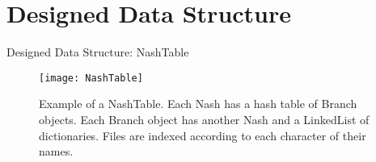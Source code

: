 \section{Designed Data Structure}
\begin{frame}{Designed Data Structure: NashTable}
	\begin{figure}[H]
  		\centering
  		\texttt{[image: NashTable]}
  		\caption{Example of a NashTable. Each Nash has a hash table of Branch objects. Each Branch object has another Nash and a LinkedList of dictionaries. Files are indexed according to each character of their names.}
	\end{figure}
\end{frame}
